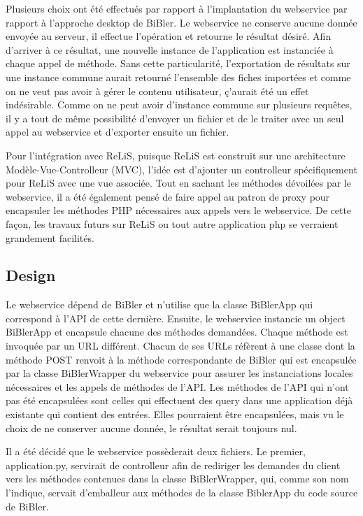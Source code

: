 \documentclass[a4paper,12pt,titlepage]{article}
\begin{document}
Plusieurs choix ont été effectués par rapport à l'implantation du webservice par rapport à l'approche desktop de BiBler. Le webservice ne conserve aucune donnée envoyée au serveur, il effectue l'opération et retourne le résultat désiré. Afin d'arriver à ce résultat, une nouvelle instance de l'application est instanciée à chaque appel de méthode. Sans cette particularité, l'exportation de résultats sur une instance commune aurait retourné l'ensemble des fiches importées et comme on ne veut pas avoir à gérer le contenu utilisateur, ç'aurait été un effet indésirable. Comme on ne peut avoir d'instance commune sur plusieurs requêtes, il y a tout de même possibilité d'envoyer un fichier et de le traiter avec un seul appel au webservice et d'exporter ensuite un fichier.\newline

Pour l'intégration avec ReLiS, puisque ReLiS est construit sur une architecture Modèle-Vue-Controlleur (MVC), l'idée est d'ajouter un controlleur spécifiquement pour ReLiS avec une vue associée. Tout en sachant les méthodes dévoilées par le webservice, il a été également pensé de faire appel au patron de proxy pour encapsuler les méthodes PHP nécessaires aux appels vers le webservice. De cette façon, les travaux futurs sur ReLiS ou tout autre application php se verraient grandement facilités.


\subsection{Design}
Le webservice dépend de BiBler et n'utilise que la classe BiBlerApp qui correspond à l'API de cette dernière. Ensuite, le webservice instancie un object BiBlerApp et encapsule chacune des méthodes demandées. Chaque méthode est invoquée par un URL différent. Chacun de ses URLs réfèrent à une classe dont la méthode POST renvoit à la méthode correspondante de BiBler qui est encapsulée par la classe BiBlerWrapper du webservice pour assurer les instanciations locales nécessaires et les appels de méthodes de l'API. Les méthodes de l'API qui n'ont pas été encapsulées sont celles qui effectuent des query dans une application déjà existante qui contient des entrées. Elles pourraient être encapsulées, mais vu le choix de ne conserver aucune donnée, le résultat serait toujours nul. \newline

Il a été décidé que le webservice possèderait deux fichiers. Le premier, application.py, servirait de controlleur afin de rediriger les demandes du client vers les méthodes contenues dans la classe BiBlerWrapper, qui, comme son nom l'indique, servait d'emballeur aux méthodes de la classe BiblerApp du code source de BiBler.
\end{document}
